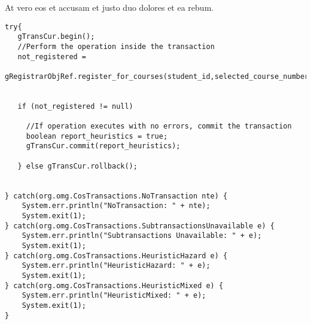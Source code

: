 At vero eos et accusam et justo duo dolores et ea rebum.

\begin{lstlisting}[style=Java, caption=Implizite Transaktion \cite{tanenbaum2007verteilte}]
try{
   gTransCur.begin();
   //Perform the operation inside the transaction
   not_registered = 
       gRegistrarObjRef.register_for_courses(student_id,selected_course_numbers);


   if (not_registered != null)

     //If operation executes with no errors, commit the transaction
     boolean report_heuristics = true;
     gTransCur.commit(report_heuristics);

   } else gTransCur.rollback();


} catch(org.omg.CosTransactions.NoTransaction nte) {
    System.err.println("NoTransaction: " + nte);
    System.exit(1);
} catch(org.omg.CosTransactions.SubtransactionsUnavailable e) {
    System.err.println("Subtransactions Unavailable: " + e);
    System.exit(1);
} catch(org.omg.CosTransactions.HeuristicHazard e) {
    System.err.println("HeuristicHazard: " + e);
    System.exit(1);
} catch(org.omg.CosTransactions.HeuristicMixed e) {
    System.err.println("HeuristicMixed: " + e);
    System.exit(1);
}
\end{lstlisting}

